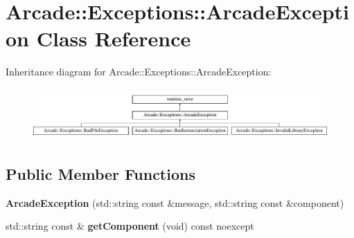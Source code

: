 \hypertarget{classArcade_1_1Exceptions_1_1ArcadeException}{}\section{Arcade\+::Exceptions\+::Arcade\+Exception Class Reference}
\label{classArcade_1_1Exceptions_1_1ArcadeException}
Inheritance diagram for Arcade\+::Exceptions\+::Arcade\+Exception\+:\begin{figure}[H]
\begin{center}
\leavevmode
\includegraphics[height=1.985816cm]{classArcade_1_1Exceptions_1_1ArcadeException}
\end{center}
\end{figure}
\subsection*{Public Member Functions}
\begin{DoxyCompactItemize}
\item 
\mbox{\label{classArcade_1_1Exceptions_1_1ArcadeException_a054c4f79319af87bfbbe79fa03809b38}} 
{\bfseries Arcade\+Exception} (std\+::string const \&message, std\+::string const \&component)
\item 
\mbox{\label{classArcade_1_1Exceptions_1_1ArcadeException_aa000c618b4fbe4a3612f511074243ce9}} 
std\+::string const  \& {\bfseries get\+Component} (void) const noexcept
\end{DoxyCompactItemize}
